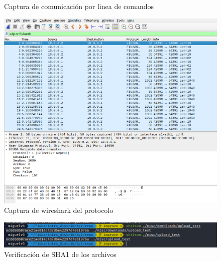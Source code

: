 \documentclass[11pt,a4paper]{article}
\begin{document}
\begin{itemize}
\begin{itemize}
\begin{figure}[H]
\begin{center}
                            \end{center}
                            \caption{Captura de comunicaci\'{o}n por linea de comandos}
                        \end{figure}
                        \begin{figure}[H]
                            \begin{center}
                            \includegraphics[width=15cm]{images/tests/t1/download/T1_4.3_download_SR_loss10.png}
                            \end{center}
                            \caption{Captura de wireshark del protocolo}
                        \end{figure}
                        \begin{figure}[H]
                        \begin{center}
                        \includegraphics[width=15cm]{images/tests/t1/download/T1_4.4_download_SR_loss10.png}
                        \end{center}
                        \caption{Verificaci\'{o}n de SHA1 de los archivos}
                    \end{figure}
                \end{itemize}
    \end{itemize}
\end{document}
